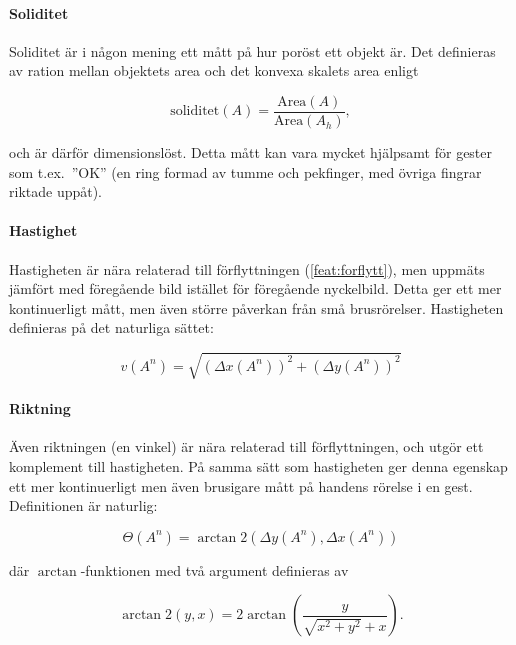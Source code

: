 \documentclass[../rapport_MVEX01-11-05]{subfiles}
\begin{document}
\paragraph{Soliditet}
\label{feat:soliditet}

Soliditet är i någon mening ett mått på hur poröst ett objekt är. Det
definieras av ration mellan objektets area och det konvexa skalets
area enligt

\begin{equation*}
  \textrm{soliditet}(A) = \frac{\textrm{Area}(A)}{\textrm{Area}(A_h)},
\end{equation*}

och är därför dimensionslöst. Detta mått kan vara mycket hjälpsamt för
gester som t.ex.~''OK'' (en ring formad av tumme och pekfinger, med
övriga fingrar riktade uppåt).


\paragraph{Hastighet}
\label{feat:hastighet}

Hastigheten är nära relaterad till förflyttningen
(\ref{feat:forflytt}), men uppmäts jämfört med föregående bild
istället för föregående nyckelbild. Detta ger ett mer kontinuerligt
mått, men även större påverkan från små brusrörelser. Hastigheten
definieras på det naturliga sättet:

\begin{equation*}
  v(A^n) = \sqrt{\left(\Delta x(A^n) \right)^2
               + \left(\Delta y(A^n) \right)^2}
\end{equation*}

\paragraph{Riktning}
\label{feat:riktning}

Även riktningen (en vinkel) är nära relaterad till förflyttningen, och utgör ett
komplement till hastigheten. På samma sätt som hastigheten ger denna
egenskap ett mer kontinuerligt men även brusigare mått på handens
rörelse i en gest. Definitionen är naturlig:

\begin{equation*}
  \Theta(A^n) = \arctan\!2\left(
  \Delta y(A^n), \Delta x(A^n)\right)
\end{equation*}

där $\arctan$-funktionen med två argument definieras av

\begin{equation*}
  \arctan\!2\left(y,x\right) = 2\arctan\left(
  \frac{y}{\sqrt{x^2+y^2}+x}
  \right).
\end{equation*}
\end{document}
